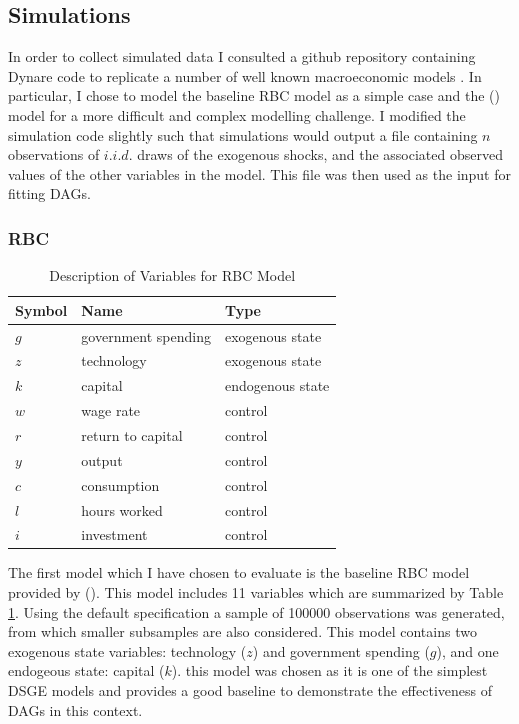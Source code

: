 \documentclass{article}
\begin{document}
\subsection{Simulations}

In order to collect simulated data I consulted a github repository containing Dynare code to replicate a number of well known macroeconomic models \parencite{pfeifer2020}. In particular, I chose to model the baseline RBC model as a simple case and the \citeauthor{smets2007shocks} (\citeyear{smets2007shocks}) model for a more difficult and complex modelling challenge. I modified the simulation code slightly such that simulations would output a file containing $n$ observations of $i.i.d.$ draws of the exogenous shocks, and the associated observed values of the other variables in the model. This file was then used as the input for fitting DAGs.

\subsubsection{RBC}

\begin{table}
  \centering
  \begin{tabular}{|l|l|l|}
    \hline
    Symbol & Name & Type \\
    \hline
    $g$ & government spending & exogenous state \\
    $z$ & technology & exogenous state \\
    $k$ & capital & endogenous state \\
    $w$ & wage rate & control \\
    $r$ & return to capital & control \\
    $y$ & output & control \\
    $c$ & consumption & control \\
    $l$ & hours worked & control \\
    $i$ & investment & control \\ \cline{2-2}
    \hline
  \end{tabular}
  \caption{Description of Variables for RBC Model}
  \label{tab1}
\end{table}

The first model which I have chosen to evaluate is the baseline RBC model provided by \citeauthor{pfeifer2020} (\citeyear{pfeifer2020}). This model includes 11 variables which are summarized by Table \ref{tab1}. Using the default specification a sample of 100000 observations was generated, from which smaller subsamples are also considered. This model contains two exogenous state variables: technology ($z$) and government spending ($g$), and one endogeous state: capital ($k$). this model was chosen as it is one of the simplest DSGE models and provides a good baseline to demonstrate the effectiveness of DAGs in this context.
\end{document}
